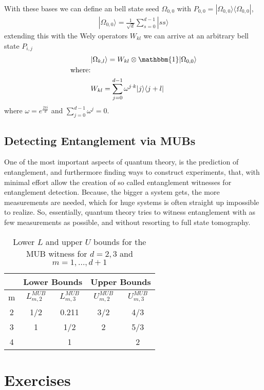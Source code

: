 \documentclass[a4paper]{article}
\begin{document}
With these bases we can define an bell state seed $\Omega_{0,0}$ with $P_{0,0}
= |\Omega_{0,0}\rangle\langle \Omega_{0,0}|$,
\begin{align}\label{eq:arb}
    |\Omega_{0,0}\rangle  = \frac{1}{\sqrt{d}} \sum_{s=0}^{d-1} |ss\rangle
\end{align}
extending this with the Wely operators $W_{kl}$ we can arrive at an arbitrary
bell state $P_{i,j}$
\begin{align}
    &|\Omega_{k,l}\rangle = W_{kl} \otimes \mathbbm{1}|\Omega_{0,0}\rangle\\
    \nonumber\text{where:}\\
    &W_{kl} = \sum_{j=0}^{d-1} \omega^{j\cdot k} |j\rangle \langle j+l|
\end{align}
where $\omega = e^{\frac{2\pi i}{d}}$ and $\sum_{j=0}^{d-1} \omega^j = 0$.

\subsection{Detecting Entanglement via MUBs}
One of the most important aspects of quantum theory, is the prediction of
entanglement, and furthermore finding ways to construct experiments, that, with
minimal effort allow the creation of so called entanglement witnesses for
entanglement detection. Because, the bigger a system gets, the more
measurements are needed, which for huge systems is often straight up impossible
to realize. So, essentially, quantum theory tries to witness entanglement with
as few measurements as possible, and without resorting to full state
tomography.
\begin{table}[h!]
    \centering
\begin{tabular}{||c|c|c || c|c||}
\hline
    & \multicolumn{2}{|c||}{Lower Bounds} &\multicolumn{2}{|c||}{Upper Bounds}\\
\hline
    m & $L_{m,2}^{MUB}$ &$L_{m,3}^{MUB}$&$U_{m,2}^{MUB}$ &$U_{m,3}^{MUB}$ \\
\hline
    2 & 1/2 &0.211 &3/2 & 4/3\\
\hline
    3 & 1 &1/2 &2 & 5/3\\
\hline
    4 & &1 &  & 2\\
\hline
\end{tabular}
    \caption{Lower $L$ and upper $U$ bounds for the MUB witness for $d = 2, 3$
    and $m=1, \dots, d+1$ \label{tab:1}}
\end{table}

\newpage
\section{Exercises}
\end{document}
